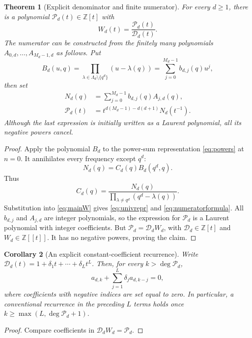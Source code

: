 \documentclass[11pt,letterpaper]{article}
\numberwithin{equation}{section}
\newtheorem{theorem}{Theorem}[section]
\newtheorem{corollary}[theorem]{Corollary}
\theoremstyle{definition}
\theoremstyle{remark}
\newcommand{\Z}{\mathbb Z}
\newcommand{\Spec}{\Lambda}
\begin{document}
\begin{theorem}[Explicit denominator and finite numerator]\label{thm:denominator}
For every $d\ge1$, there is a polynomial $\mathcal P_d(t)\in\Z[t]$ with
\begin{equation}\label{eq:univrepr}
 W_d(t)=\frac{\mathcal P_d(t)}{\mathcal D_d(t)}.
\end{equation}
The numerator can be constructed from the finitely many polynomials
$A_{0,d},\ldots,A_{M_d-1,d}$ as follows. Put
\begin{equation}\label{eq:annihilator}
 B_d(u,q)=\prod_{\lambda\in\Spec_d\setminus\{q^d\}}(u-\lambda(q))
            =\sum_{j=0}^{M_d-1}b_{d,j}(q)u^j,
\end{equation}
then set
\begin{equation}\label{eq:numeratorformula}
\begin{split}
 N_d(q)&=\sum_{j=0}^{M_d-1}b_{d,j}(q)A_{j,d}(q),\\
 \mathcal P_d(t)&=t^{d(M_d-1)-d(d+1)}N_d(t^{-1}).
\end{split}
\end{equation}
Although the last expression is initially written as a Laurent
polynomial, all its negative powers cancel.
\end{theorem}
\begin{proof}
Apply the polynomial $B_d$ to the power-sum representation
\eqref{eq:powers} at $n=0$. It annihilates every frequency except $q^d$:
\[
 N_d(q)=C_d(q)B_d(q^d,q).
\]
Thus
\begin{equation}\label{eq:Cformula}
 C_d(q)=\frac{N_d(q)}{
          \prod_{\lambda\ne q^d}(q^d-\lambda(q))}.
\end{equation}
Substitution into \eqref{eq:mainW} gives \eqref{eq:univrepr} and
\eqref{eq:numeratorformula}. All $b_{d,j}$ and $A_{j,d}$ are integer
polynomials, so the expression for $\mathcal P_d$ is a Laurent
polynomial with integer coefficients. But
$\mathcal P_d=\mathcal D_dW_d$, with $\mathcal D_d\in\Z[t]$ and
$W_d\in\Z[[t]]$. It has no negative powers, proving the claim.
\end{proof}

\begin{corollary}[An explicit constant-coefficient recurrence]\label{cor:recurrence}
Write $\mathcal D_d(t)=1+\delta_1t+\cdots+\delta_Lt^L$.
Then, for every $k>\deg\mathcal P_d$,
\begin{equation}\label{eq:coeffrecurrence}
 a_{d,k}+\sum_{j=1}^{L}\delta_j a_{d,k-j}=0,
\end{equation}
where coefficients with negative indices are set equal to zero.
In particular, a conventional recurrence in the preceding $L$ terms
holds once $k\ge\max(L,\deg\mathcal P_d+1)$.
\end{corollary}
\begin{proof}
Compare coefficients in $\mathcal D_dW_d=\mathcal P_d$.
\end{proof}
\end{document}
